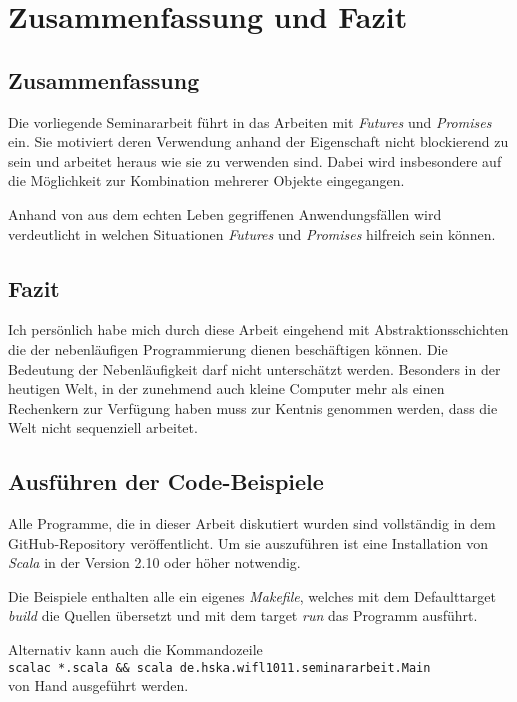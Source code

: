 \section{Zusammenfassung und Fazit}

\subsection{Zusammenfassung}

Die vorliegende Seminararbeit führt in das Arbeiten mit \emph{Futures}
und \emph{Promises} ein. Sie motiviert deren Verwendung anhand der
Eigenschaft nicht blockierend zu sein und arbeitet heraus wie sie
zu verwenden sind. Dabei wird insbesondere auf die Möglichkeit
zur Kombination mehrerer Objekte eingegangen.

Anhand von aus dem echten Leben gegriffenen Anwendungsfällen wird
verdeutlicht in welchen Situationen \emph{Futures} und \emph{Promises}
hilfreich sein können.

\subsection{Fazit}

Ich persönlich habe mich durch diese Arbeit eingehend mit 
Abstraktionsschichten die der nebenläufigen Programmierung dienen
beschäftigen können. Die Bedeutung der Nebenläufigkeit darf nicht
unterschätzt werden. Besonders in der heutigen Welt, in der zunehmend
auch kleine Computer mehr als einen Rechenkern zur Verfügung haben
muss zur Kentnis genommen werden, dass die Welt nicht sequenziell
arbeitet. 

\subsection{Ausführen der Code-Beispiele}

Alle Programme, die in dieser Arbeit diskutiert wurden sind 
vollständig in dem GitHub-Repository \cite{code} veröffentlicht.
Um sie auszuführen ist eine Installation von \emph{Scala} in der
Version 2.10 oder höher notwendig.

Die Beispiele enthalten alle ein eigenes \emph{Makefile}, welches
mit dem Defaulttarget \emph{build} die Quellen übersetzt und mit
dem target \emph{run} das Programm ausführt.

Alternativ kann auch die Kommandozeile \\
\texttt{scalac *.scala \&\& scala de.hska.wifl1011.seminararbeit.Main} \\
von Hand ausgeführt werden.

